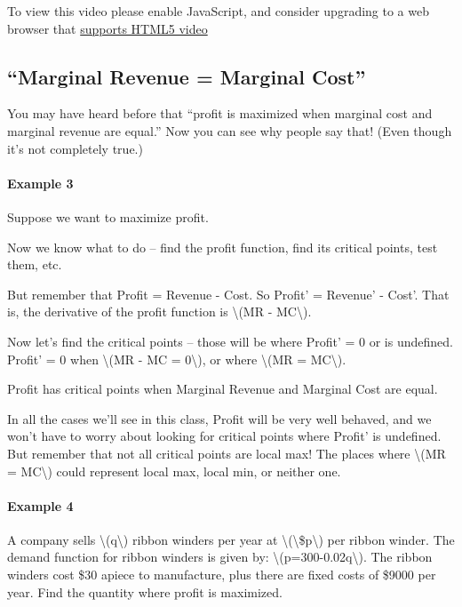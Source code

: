 To view this video please enable JavaScript, and consider upgrading to a
web browser that \href{http://videojs.com/html5-video-support/}{supports
HTML5 video}

\hypertarget{marginal-revenue-marginal-cost}{%
\subsection{``Marginal Revenue = Marginal
Cost''}\label{marginal-revenue-marginal-cost}}

You may have heard before that ``profit is maximized when marginal cost
and marginal revenue are equal.'' Now you can see why people say that!
(Even though it's not completely true.)

\hypertarget{example-3}{%
\paragraph{Example 3}\label{example-3}}

Suppose we want to maximize profit.

Now we know what to do -- find the profit function, find its critical
points, test them, etc.

But remember that Profit = Revenue - Cost. So Profit' = Revenue' -
Cost'. That is, the derivative of the profit function is
\textbackslash{}(MR - MC\textbackslash{}).

Now let's find the critical points -- those will be where Profit' = 0 or
is undefined. Profit' = 0 when \textbackslash{}(MR - MC =
0\textbackslash{}), or where \textbackslash{}(MR = MC\textbackslash{}).

Profit has critical points when Marginal Revenue and Marginal Cost are
equal.

In all the cases we'll see in this class, Profit will be very well
behaved, and we won't have to worry about looking for critical points
where Profit' is undefined. But remember that not all critical points
are local max! The places where \textbackslash{}(MR =
MC\textbackslash{}) could represent local max, local min, or neither
one.

\hypertarget{example-4}{%
\paragraph{Example 4}\label{example-4}}

A company sells \textbackslash{}(q\textbackslash{}) ribbon winders per
year at \textbackslash{}(\textbackslash{}\$p\textbackslash{}) per ribbon
winder. The demand function for ribbon winders is given by:
\textbackslash{}(p=300-0.02q\textbackslash{}). The ribbon winders cost
\$30 apiece to manufacture, plus there are fixed costs of \$9000 per
year. Find the quantity where profit is maximized.

